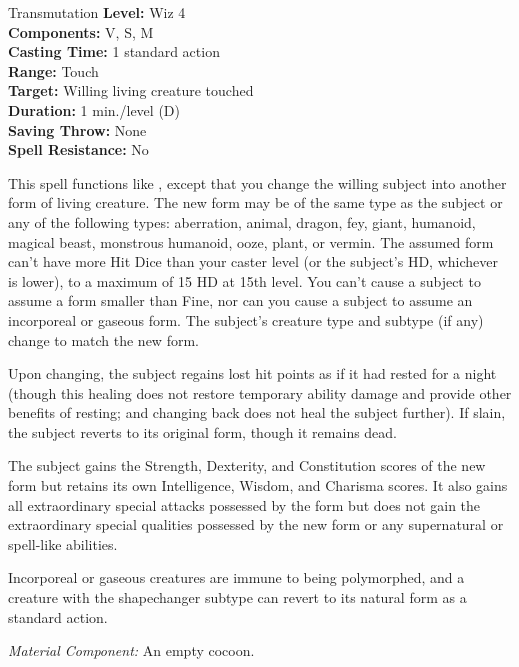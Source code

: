{Transmutation}
{
	\textbf{Level:}
	Wiz 4\\
	\textbf{Components:}
	V, S, M\\
	\textbf{Casting Time:}
	1 standard action\\
	\textbf{Range:}
	Touch\\
	\textbf{Target:}
	Willing living creature touched\\
	\textbf{Duration:}
	1 min./level (D)\\
	\textbf{Saving Throw:}
	None\\
	\textbf{Spell Resistance:}
	No\\
}
{
	This spell functions like , except that you change the willing subject into another form of living creature. The new form may be of the same type as the subject or any of the following types: aberration, animal, dragon, fey, giant, humanoid, magical beast, monstrous humanoid, ooze, plant, or vermin. The assumed form can't have more Hit Dice than your caster level (or the subject's HD, whichever is lower), to a maximum of 15 HD at 15th level. You can't cause a subject to assume a form smaller than Fine, nor can you cause a subject to assume an incorporeal or gaseous form. The subject's creature type and subtype (if any) change to match the new form.

	Upon changing, the subject regains lost hit points as if it had rested for a night (though this healing does not restore temporary ability damage and provide other benefits of resting; and changing back does not heal the subject further). If slain, the subject reverts to its original form, though it remains dead.

	The subject gains the Strength, Dexterity, and Constitution scores of the new form but retains its own Intelligence, Wisdom, and Charisma scores. It also gains all extraordinary special attacks possessed by the form but does not gain the extraordinary special qualities possessed by the new form or any supernatural or spell-like abilities.

	Incorporeal or gaseous creatures are immune to being polymorphed, and a creature with the shapechanger subtype can revert to its natural form as a standard action.

	\textit{Material Component:}
	An empty cocoon.

}
